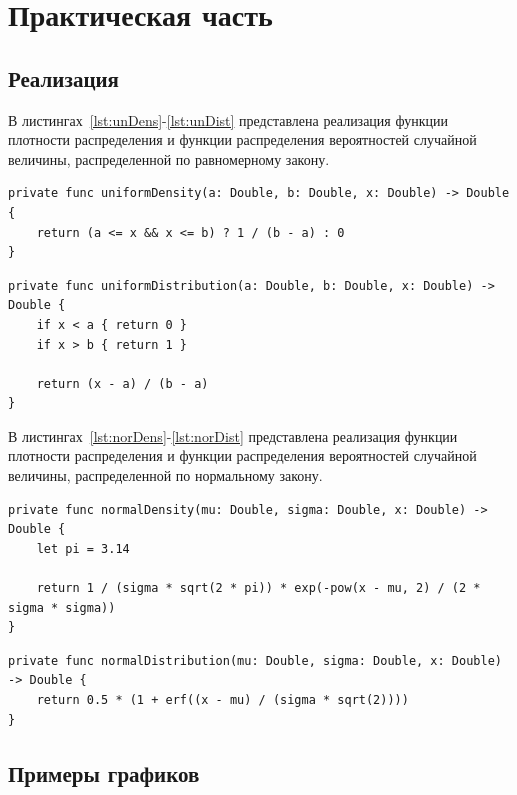 \chapter{Практическая часть}

\section{Реализация}

В листингах~\ref{lst:unDens}-\ref{lst:unDist} представлена реализация функции плотности распределения и функции распределения вероятностей
случайной величины, распределенной по равномерному закону.

\begin{lstlisting}[label=lst:unDens, caption=Реализация функции плотности равномерного распределения]
private func uniformDensity(a: Double, b: Double, x: Double) -> Double {
    return (a <= x && x <= b) ? 1 / (b - a) : 0
}
\end{lstlisting}

\begin{lstlisting}[label=lst:unDist, caption=Реализация функции равномерного распределения]
private func uniformDistribution(a: Double, b: Double, x: Double) -> Double {
    if x < a { return 0 }
    if x > b { return 1 }
    
    return (x - a) / (b - a)
}
\end{lstlisting}

В листингах~\ref{lst:norDens}-\ref{lst:norDist} представлена реализация функции плотности распределения и функции распределения вероятностей
случайной величины, распределенной по нормальному закону.

\begin{lstlisting}[label=lst:norDens,caption=Реализация функции плотности нормального распределения]
private func normalDensity(mu: Double, sigma: Double, x: Double) -> Double {
    let pi = 3.14
    
    return 1 / (sigma * sqrt(2 * pi)) * exp(-pow(x - mu, 2) / (2 * sigma * sigma))
}
\end{lstlisting}

\begin{lstlisting}[label=lst:norDist, caption=Реализация функции нормального распределения]
private func normalDistribution(mu: Double, sigma: Double, x: Double) -> Double {
    return 0.5 * (1 + erf((x - mu) / (sigma * sqrt(2))))
}
\end{lstlisting}

\section{Примеры графиков}

